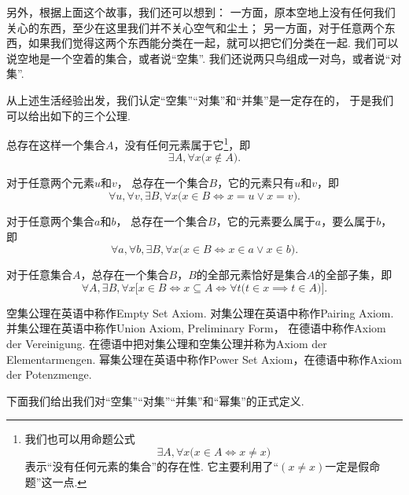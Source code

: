 另外，根据上面这个故事，我们还可以想到：
一方面，原本空地上没有任何我们关心的东西，至少在这里我们并不关心空气和尘土；
另一方面，对于任意两个东西，如果我们觉得这两个东西能分类在一起，就可以把它们分类在一起.
我们可以说空地是一个空着的集合，或者说“空集”.
我们还说两只鸟组成一对鸟，或者说“对集”.

从上述生活经验出发，我们认定“空集”“对集”和“并集”是一定存在的，
于是我们可以给出如下的三个公理.

\begin{axiom}[空集公理]\label{axiom:集合论.空集公理}
总存在这样一个集合\(A\)，没有任何元素属于它\footnote{%
我们也可以用命题公式\[
	\exists A, \forall x \bigl( x \in A \iff x \neq x \bigr)
\]表示“没有任何元素的集合”的存在性.
它主要利用了“\((x \neq x)\)一定是假命题”这一点.
}，即\[
	\exists A, \forall x \bigl( x \notin A \bigr).
\]
\end{axiom}

\begin{axiom}[对集公理]\label{axiom:集合论.对集公理}
对于任意两个元素\(u\)和\(v\)，
总存在一个集合\(B\)，它的元素只有\(u\)和\(v\)，即\[
	\forall u, \forall v, \exists B, \forall x
	\bigl(
		x \in B \iff x = u \lor x = v
	\bigr).
\]
\end{axiom}

\begin{axiom}[并集公理I]
对于任意两个集合\(a\)和\(b\)，
总存在一个集合\(B\)，它的元素要么属于\(a\)，要么属于\(b\)，即\[
	\forall a, \forall b, \exists B, \forall x
	\bigl(
		x \in B
		\iff
		x \in a \lor x \in b
	\bigr).
\]
\end{axiom}

\begin{axiom}[幂集公理]
	对于任意集合\(A\)，总存在一个集合\(B\)，\(B\)的全部元素恰好是集合\(A\)的全部子集，即\[
	\forall A, \exists B, \forall x \bigl[
		x \in B
		\iff
		x \subseteq A
		\iff
		\forall t \bigl( t \in x \implies t \in A \bigr)
	\bigr].
\]
\end{axiom}


空集公理在英语中称作Empty Set Axiom.
对集公理在英语中称作Pairing Axiom.
并集公理在英语中称作Union Axiom, Preliminary Form，
在德语中称作Axiom der Vereinigung.
在德语中把对集公理和空集公理并称为Axiom der Elementarmengen.
幂集公理在英语中称作Power Set Axiom，在德语中称作Axiom der Potenzmenge.

下面我们给出我们对“空集”“对集”“并集”和“幂集”的正式定义.

